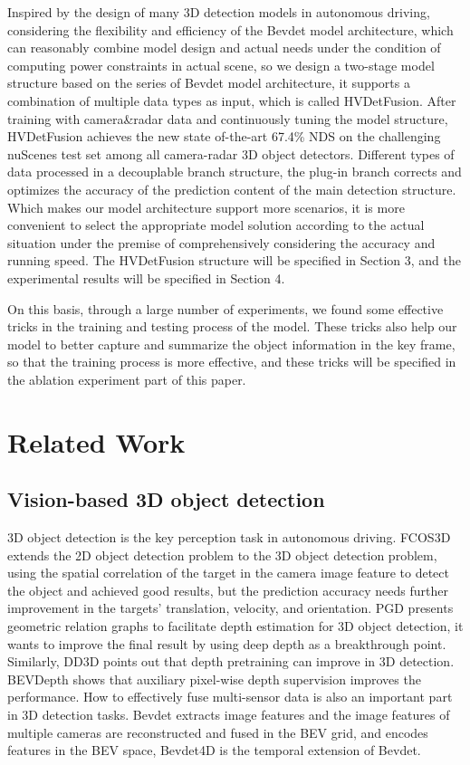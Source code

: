 \documentclass[10pt,twocolumn,letterpaper]{article}
\begin{document}
Inspired by the design of many 3D detection models in autonomous driving, considering the flexibility and efficiency of the Bevdet model architecture, which can reasonably combine model design and actual needs under the condition of computing power constraints in actual scene, so we design a two-stage model structure based on the series of Bevdet model architecture, it supports a combination of multiple data types as input, which is called HVDetFusion. After training with camera\&radar data and continuously tuning the model structure, HVDetFusion achieves the new state of-the-art 67.4\% NDS on the challenging nuScenes test set among all camera-radar 3D object detectors. Different types of data processed in a decouplable branch structure, the plug-in branch corrects and optimizes the accuracy of the prediction content of the main detection structure. Which makes our model architecture support more scenarios, it is more convenient to select the appropriate model solution according to the actual situation under the premise of comprehensively considering the accuracy and running speed. The HVDetFusion structure will be specified in Section 3, and the experimental results will be specified in Section 4.

On this basis, through a large number of experiments, we found some effective tricks in the training and testing process of the model. These tricks also help our model to better capture and summarize the object information in the key frame, so that the training process is more effective, and these tricks will be specified in the ablation experiment part of this paper.

\section{Related Work}
\subsection{Vision-based 3D object detection}
3D object detection is the key perception task in autonomous driving. FCOS3D\cite{wang2021fcos3d} extends the 2D object detection problem to the 3D object detection problem, using the spatial correlation of the target in the camera image feature to detect the object and achieved good results, but the prediction accuracy needs further improvement in the targets' translation, velocity, and orientation. PGD\cite{wang2022probabilistic} presents geometric relation graphs to facilitate depth estimation for 3D object detection, it wants to improve the final result by using deep depth as a breakthrough point. Similarly, DD3D\cite{park2021pseudo} points out that depth pretraining can improve in 3D detection. BEVDepth\cite{li2022bevdepth} shows that auxiliary pixel-wise depth supervision improves the performance. How to effectively fuse multi-sensor data is also an important part in 3D detection tasks. Bevdet\cite{huang2021bevdet} extracts image features and the image features of multiple cameras are reconstructed and fused in the BEV grid, and encodes features in the BEV space, Bevdet4D\cite{huang2022bevdet4d} is the temporal extension of Bevdet\cite{huang2021bevdet}.
\end{document}
